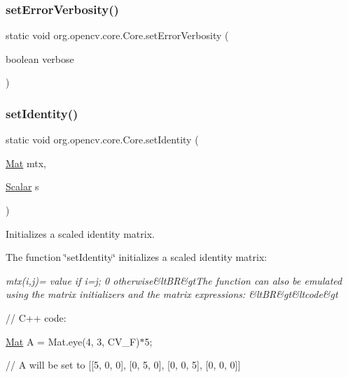 \subsubsection{\texorpdfstring{set\+Error\+Verbosity()}{setErrorVerbosity()}}
{\footnotesize\ttfamily static void org.\+opencv.\+core.\+Core.\+set\+Error\+Verbosity (\begin{DoxyParamCaption}\item[{boolean}]{verbose }\end{DoxyParamCaption})\hspace{0.3cm}{\ttfamily [static]}}

\mbox{\label{classorg_1_1opencv_1_1core_1_1_core_ae3f55d8eaa889edf706fb60874e92bd4}} 
\subsubsection{\texorpdfstring{set\+Identity()}{setIdentity()}\hspace{0.1cm}{\footnotesize\ttfamily [1/2]}}
{\footnotesize\ttfamily static void org.\+opencv.\+core.\+Core.\+set\+Identity (\begin{DoxyParamCaption}\item[{\mbox{\hyperlink{classorg_1_1opencv_1_1core_1_1_mat}{Mat}}}]{mtx,  }\item[{\mbox{\hyperlink{classorg_1_1opencv_1_1core_1_1_scalar}{Scalar}}}]{s }\end{DoxyParamCaption})\hspace{0.3cm}{\ttfamily [static]}}

Initializes a scaled identity matrix.

The function \char`\"{}set\+Identity\char`\"{} initializes a scaled identity matrix\+:

{\itshape mtx(i,j)= value if i=j; 0 otherwise\&lt\+BR\&gt\+The function can also be emulated using the matrix initializers and the matrix expressions\+: \&lt\+BR\&gt\&ltcode\&gt}

// C++ code\+:

\mbox{\hyperlink{classorg_1_1opencv_1_1core_1_1_mat}{Mat}} A = Mat.\+eye(4, 3, C\+V\+\_\+F)$\ast$5;

// A will be set to \mbox{[}\mbox{[}5, 0, 0\mbox{]}, \mbox{[}0, 5, 0\mbox{]}, \mbox{[}0, 0, 5\mbox{]}, \mbox{[}0, 0, 0\mbox{]}\mbox{]}


